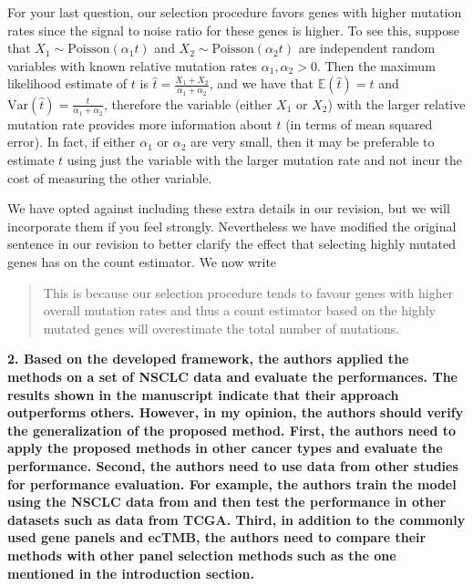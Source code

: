 \documentclass[12pt]{article}
\begin{document}
For your last question, our selection procedure favors genes with higher mutation rates since the signal to noise ratio for these genes is higher.  To see this, suppose that $X_1 \sim \mathrm{Poisson}(\alpha_1 t)$ and $X_2 \sim \mathrm{Poisson}(\alpha_2 t)$ are independent random variables with known relative mutation rates $\alpha_1,\alpha_2 > 0$. Then the maximum likelihood estimate of $t$ is $\hat{t} = \frac{X_1 + X_2}{\alpha_1 + \alpha_2}$, and we have that $\mathbb{E}(\hat{t}) = t$ and $\mathrm{Var}(\hat{t}) = \frac{t}{\alpha_1+\alpha_2}$, therefore the variable (either $X_1$ or $X_2$) with the larger relative mutation rate provides more information about $t$ (in terms of mean squared error). In fact, if either $\alpha_1$ or $\alpha_2$ are very small, then it may be preferable to estimate $t$ using just the variable with the larger mutation rate and not incur the cost of measuring the other variable.   %

We have opted against including these extra details in our revision, but we will incorporate them if you feel strongly.  Nevertheless we have modified the original sentence in our revision to better clarify the effect that selecting highly mutated genes has on the count estimator.  We now write
\begin{quotation}
This is because our selection procedure tends to favour genes with higher overall mutation rates and thus a count estimator based on the highly mutated genes will overestimate the  total number of mutations.
\end{quotation}



\textbf{2. Based on the developed framework, the authors applied the methods on a set of NSCLC data and evaluate the performances. The results shown in the manuscript indicate that their approach outperforms others. However, in my opinion, the authors should verify the generalization of the proposed method. First, the authors need to apply the proposed methods in other cancer types and evaluate the performance. Second, the authors need to use data from other studies for performance evaluation. For example, the authors train the model using the NSCLC data from \citet{campbell_distinct_2016} and then test the performance in other datasets such as data from TCGA. Third, in addition to the commonly used gene panels and ecTMB, the authors need to compare their methods with other panel selection methods such as the one mentioned in the introduction section.}
\end{document}
